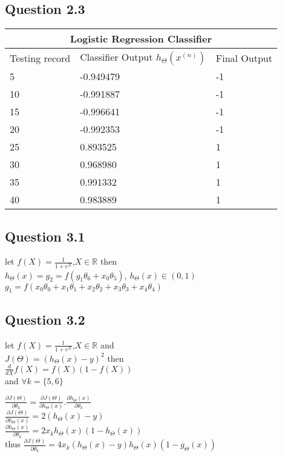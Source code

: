 \documentclass[10pt]{article}
\begin{document}
\subsection*{Question 2.3}
\begin{tabular}{ 
|p{4cm}||p{5cm}|p{4cm}|  }
 \hline
 \multicolumn{3}{|c|}{Logistic Regression Classifier} \\
 \hline
 
 Testing record & Classifier Output $h_{\Theta}(x^{(n)})$ & Final Output\\
 \hline
 5&-0.949479&-1\\
 10&-0.991887&-1\\
 15&-0.996641&-1\\
 20&-0.992353&-1\\
 25&0.893525&1\\
 30&0.968980&1\\
 35&0.991332&1\\
 40&0.983889&1\\
 \hline
 
\end{tabular}

\pagebreak 
\subsection*{Question 3.1}
let $f(X) = \frac{1}{1 + e^{X}}$,\quad $ X \in \mathbb{R} $ then\\
$h_{\Theta}(x) = g_{2} = f(g_{1} \theta_{6} + x_{0} \theta_{5}) $,  $h_{\Theta}(x) \in (0, 1)$\\
$g_{1} = f(x_{0} \theta_{0} + x_{1} \theta_{1} + x_{2} \theta_{2} + x_{3} \theta_{3} + x_{4} \theta_{4})$
\subsection*{Question 3.2}
\noindent let $f(X) = \frac{1}{1 + e^{X}}$,\quad $ X \in \mathbb{R} $ and\\
\noindent $J(\Theta) = (h_{\Theta}(x) - y)^{2}$ then\\
\noindent $\frac{d}{d X} f(X) = f(X) (1 - f(X))$ \\ 
\noindent and \quad $\forall k = \{5, 6\}$ \\ \bigskip

\noindent $\frac{\partial J(\Theta)}{\partial \theta_{k}} = \frac{\partial J(\Theta)}{\partial h_{\Theta}(x)} . \frac{\partial h_{\Theta}(x)}{\partial \theta_{k}}$\\
\noindent $\frac{\partial J(\Theta)}{\partial h_{\Theta}(x)} = 2 (h_{\Theta}(x) - y)$ \\
\noindent $\frac{\partial h_{\Theta}(x)}{\partial \theta_{k}} = 2 x_{k} h_{\Theta}(x) (1 - h_{\Theta}(x))$\\
\noindent thus $\frac{\partial J(\Theta)}{\partial \theta_{k}} = 4 x_{k} (h_{\Theta}(x) - y) h_{\Theta}(x) (1 - g_{\Theta}(x))$ \\ \bigskip
\end{document}
